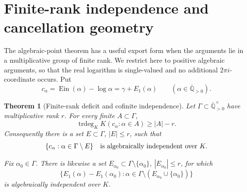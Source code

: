 \documentclass[11pt]{article}
\newtheorem{theorem}{Theorem}[section]
\theoremstyle{definition}
\theoremstyle{remark}
\newcommand{\Qbar}{\overline{\mathbb Q}}
\newcommand{\Ein}{\operatorname{Ein}}
\newcommand{\trdeg}{\operatorname{trdeg}}
\begin{document}
\section{Finite-rank independence and cancellation geometry}
\label{sec:rank-deficit}

The algebraic-point theorem has a useful export form when the arguments lie
in a multiplicative group of finite rank.  We restrict here to positive
algebraic arguments, so that the real logarithm is single-valued and no
additional \(2\pi i\)-coordinate occurs.  Put
\begin{equation}\label{eq:c-alpha}
 c_\alpha=\Ein(\alpha)-\log\alpha=\gamma+E_1(\alpha)
 \qquad(\alpha\in\Qbar_{>0}).
\end{equation}

\begin{theorem}[Finite-rank deficit and cofinite independence]
\label{thm:cofinite-independence}
Let \(\Gamma\subset\Qbar_{>0}^{\times}\) have multiplicative rank \(r\).
For every finite \(A\subset\Gamma\),
\begin{equation}\label{eq:finite-rank-deficit}
 \trdeg_KK(c_\alpha:\alpha\in A)\ge |A|-r.
\end{equation}
Consequently there is a set \(E\subset\Gamma\), \(|E|\le r\), such that
\begin{equation}\label{eq:cofinite-family}
 \{c_\alpha:\alpha\in\Gamma\setminus E\}
 \quad\hbox{is algebraically independent over }K.
\end{equation}

Fix \(\alpha_0\in\Gamma\).  There is likewise a set
\(E_{\alpha_0}\subset\Gamma\setminus\{\alpha_0\}\),
\(|E_{\alpha_0}|\le r\), for which
\begin{equation}\label{eq:cofinite-differences}
 \{E_1(\alpha)-E_1(\alpha_0):
 \alpha\in\Gamma\setminus(E_{\alpha_0}\cup\{\alpha_0\})\}
\end{equation}
is algebraically independent over \(K\).
\end{theorem}
\end{document}
